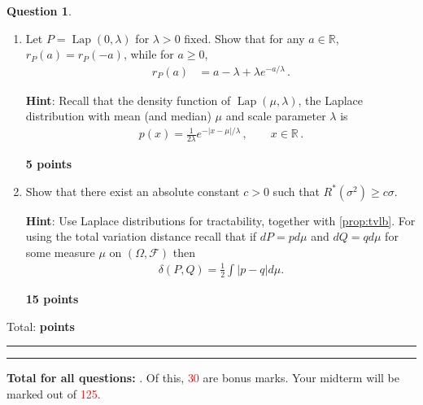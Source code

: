 \documentclass{article}
\newcommand{\R}{\mathbb{R}}
\DeclareMathOperator{\Lap}{Lap}
\DeclareMathOperator*{\1}{\mathbbm{1}}
\newcommand{\cF}{\mathcal{F}}
\newcounter{DocPoints}
\newcounter{QuestionPoints}
\newcommand{\points}[1]{	\par\mbox{}\par\noindent\hfill {\bf #1 points}	\addtocounter{DocPoints}{#1}
	\addtocounter{QuestionPoints}{#1}
}
\newcommand{\tpoints}[1]{        	\ifthenelse{\isempty{#1}}	{	}	{		\addtocounter{DocPoints}{#1}
		\addtocounter{QuestionPoints}{#1}
	}													 	\par\mbox{}\par\noindent\hfill {Total: \bf \arabic{QuestionPoints}\xspace points}\par\mbox{}\par\hrule\hrule
	\setcounter{QuestionPoints}{0}
}
\theoremstyle{definition}
\newtheorem{question}{Question}
\theoremstyle{remark}
\newcommand{\hint}{\noindent \textbf{Hint}:\xspace}
\begin{document}
\begin{question}
\begin{enumerate}[(Q1)]
\points{5}

\item 
Let $P = \Lap(0,\lambda)$ for $\lambda>0$ fixed.
Show that for any $a\in \R$, $r_P(a)=r_P(-a)$,
while for $a\ge 0$, 
\begin{align*}
r_P(a) 
 & = a-\lambda + \lambda e^{-a/\lambda}\,.
\end{align*}

\hint
Recall that the density function of $\Lap(\mu,\lambda)$, the Laplace distribution with mean (and median) $\mu$ and scale parameter $\lambda$ is 
\begin{align*}
p(x) = \frac{1}{2\lambda} e^{-|x-\mu|/\lambda}\,, \qquad x\in \R\,.
\end{align*}

\points{5}


\item Show that there exist an absolute constant $c>0$ such that 
$R^*(\sigma^2) \ge  c \sigma$.

\hint Use Laplace distributions for tractability, together with \cref{prop:tvlb}. For using the total variation distance recall that if $dP = p d\mu$ and $dQ = q d\mu$ for some measure $\mu$ on $(\Omega,\cF)$ then 
\begin{align}\label{eq:tvip}
\delta(P,Q) = \frac12 \int |p-q| d\mu.
\end{align}
\points{15}

\end{enumerate}
 
\tpoints{}
\end{question}





\bigskip
\bigskip

\noindent
\textbf{
Total for all questions: }.
Of this, \textcolor{red}{30} are bonus marks. 
Your midterm will be marked out of \textcolor{red}{125}.
\end{document}
